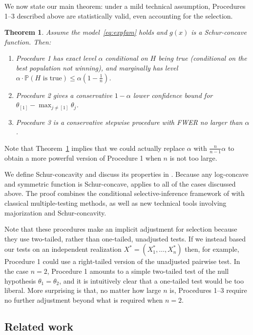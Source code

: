 \documentclass[aos, authoryear]{imsart}
\newtheorem{theorem}[corollary]{Theorem}
\theoremstyle{definition}
\theoremstyle{custom}
\newcommand{\PP}{\mathbb{P}}
\begin{document}
We now state our main theorem: under a mild technical assumption, Procedures 1--3 described above are statistically valid, even accounting for the selection.
\begin{theorem}
\label{thm:main}
Assume the model~\eqref{eq:expfam} holds and $g\left(x\right)$ is a Schur-concave function. Then:
\begin{enumerate}
\item Procedure 1 has exact level $\alpha$ conditional on $H$ being true (conditional on the best population not winning), and marginally has level $\alpha \cdot \PP(H \text{ is true}) \leq \alpha \left(1-\frac{1}{n}\right)$.
\item Procedure 2 gives a conservative $1-\alpha$ lower confidence bound for $\theta_{[1]} - \max_{j \ne [1]} \theta_{j}$.
\item Procedure 3 is a conservative stepwise procedure with FWER no larger than $\alpha$.
\end{enumerate}
\end{theorem}

Note that Theorem~\ref{thm:main} implies that we could actually replace $\alpha$ with $\frac{n}{n-1} \alpha$ to obtain a more powerful version of Procedure 1 when $n$ is not too large.

We define Schur-concavity and discuss its properties in . Because any log-concave and symmetric function is Schur-concave,  applies to all of the cases discussed above. The proof combines the conditional selective-inference framework of \citet{Fithian:2014ws} with classical multiple-testing methods, as well as new technical tools involving majorization and Schur-concavity.

Note that these procedures make an implicit adjustment for selection because they use two-tailed, rather than one-tailed, unadjusted tests. If we instead based our tests on an independent realization $X^* = (X_1^*, \ldots, X_n^*)$ then, for example, Procedure 1 could use a right-tailed version of the unadjusted pairwise test. In the case $n = 2$, Procedure 1 amounts to a simple two-tailed test of the null hypothesis $\theta_1 = \theta_2$, and it is intuitively clear that a one-tailed test would be too liberal. More surprising is that, no matter how large $n$ is, Procedures 1--3 require no further adjustment beyond what is required when $n = 2$. 

\subsection{Related work}
\label{sec:related}
\end{document}
